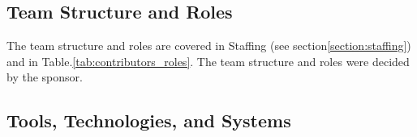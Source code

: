 \subsection{Team Structure and Roles}

The team structure and roles are covered in Staffing (see section\:\ref{section:staffing}) and in Table.\:\ref{tab:contributors_roles}. The team structure and roles were decided by the sponsor.

\subsection{Tools, Technologies, and Systems}
\label{subsection:tools_technologies_and_systems}

